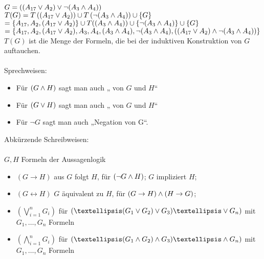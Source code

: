 \beispiel{}
$G= \left( (A_{17} \vee A_2) \vee \neg (A_3 \wedge A_4) \right)$\\
$T(G) = T \left( (A_{17} \vee A_2) \right) \cup T \left(\neg ( A_3 \wedge A_4) \right) \cup \{G\}$\\
$= \{ A_{17}, A_2, (A_{17} \vee A_2) \} \cup T((A_3 \wedge A_4)) \cup \{ \neg (A_3 \wedge A_4) \} \cup \{G\}$\\
$= \{A_{17}, A_2, (A_{17} \vee A_2), A_3, A_4, (A_3 \wedge A_4), \neg (A_3 \wedge A_4), \left( (A_{17} \vee A_2) \wedge \neg (A_3 \wedge A_4) \right) \}$\\
    
\bemerkung{}
$T(G)$ ist die Menge der Formeln, die bei der induktiven Konstruktion von $G$ auftauchen.\\
\noindent\\
Sprechweisen:
\begin{itemize}
\item Für $(G \wedge H)$ sagt man auch „ von $G$ und $H$“
\item Für $(G \vee H)$ sagt man auch „ von $G$ und $H$“
\item Für $\neg G$ sagt man auch „Negation von G“.
\end{itemize}

\vspace{1cm}
\noindent
Abkürzende Schreibweisen:\\
\noindent\\
$G, H$ Formeln der Aussagenlogik
\begin{itemize}
\item $(G \rightarrow H)$ aus $G$ folgt $H$, für $(\neg G \wedge H)$; $G$ impliziert $H$; 
\item $(G \leftrightarrow H)$ $G$ äquivalent zu $H$, für $(G \rightarrow H) \wedge (H \rightarrow G)$; 
\item $( \bigvee_{i=1}^{n} G_i )$ für $\left( … (G_1 \OR G_2) \OR G_3 ) … \OR G_n \right)$ \hspace{1cm}mit $G_1, …, G_n$ Formeln
\item $( \bigwedge_{i=1}^n G_i )$ für $\left(… ( G_1 \AND G_2) \AND G_3) … \AND G_n \right)$ \hspace{1cm}mit $G_1, …, G_n$ Formeln
\end{itemize}

